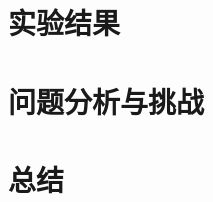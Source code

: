 \documentclass[a4paper,twoside,AutoFakeBold]{article}
\theoremstyle{definition}
\begin{document}
%
\section{实验结果}\label{section:experiment}

%
\section{问题分析与挑战}\label{section:problem}

%
\section{总结}\label{section:conclusion}






\end{document}
